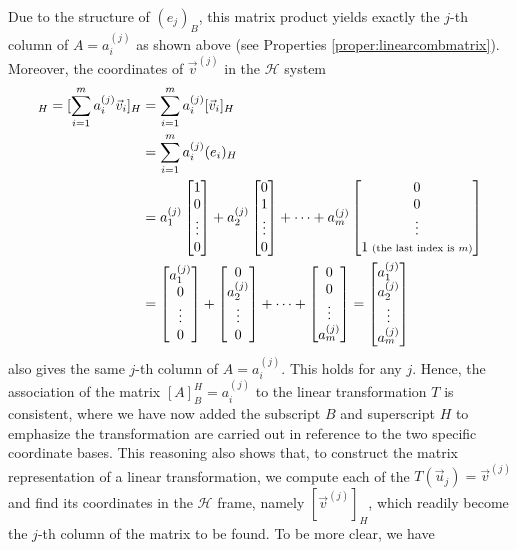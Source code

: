 Due to the structure of $(e_j)_B$, this matrix product yields exactly the $j$-th column of $A = a_i^{(j)}$ as shown above (see Properties \ref{proper:linearcombmatrix}). Moreover, the coordinates of $\vec{v}^{(j)}$ in the $\mathcal{H}$ system
\begin{align*}
[\vec{v}^{(j)}]_H = [\sum_{i=1}^{m} a_i^{(j)}\vec{v}_i]_H &= \sum_{i=1}^{m} a_i^{(j)}[\vec{v}_i]_H \\
&= \sum_{i=1}^{m} a_i^{(j)}(e_i)_H \\
&=  a_1^{(j)} \begin{bmatrix}
1 \\
0 \\
\vdots \\
0
\end{bmatrix}
+
a_2^{(j)} \begin{bmatrix}
0 \\
1 \\
\vdots \\
0
\end{bmatrix}
+ \cdots
+
a_m^{(j)} \begin{bmatrix}
0 \\
0 \\
\vdots \\
1 {\scriptsize \text{ (the last index is $m$)}}
\end{bmatrix}
\\
&= \begin{bmatrix}
a_1^{(j)} \\
0 \\
\vdots \\
0
\end{bmatrix}
+
\begin{bmatrix}
0 \\
a_2^{(j)} \\
\vdots \\
0
\end{bmatrix}
+ \cdots
+
\begin{bmatrix}
0 \\
0 \\
\vdots \\
a_m^{(j)}
\end{bmatrix}
=
\begin{bmatrix}
a_1^{(j)} \\
a_2^{(j)} \\
\vdots \\
a_m^{(j)}
\end{bmatrix}
\end{align*}
also gives the same $j$-th column of $A = a_i^{(j)}$. This holds for any $j$. Hence, the association of the matrix $[A]_B^H = a_i^{(j)}$ to the linear transformation $T$ is consistent, where we have now added the subscript $B$ and superscript $H$ to emphasize the transformation are carried out in reference to the two specific coordinate bases. This reasoning also shows that, to construct the matrix representation of a linear transformation, we compute each of the $T(\vec{u}_j) = \vec{v}^{(j)}$ and find its coordinates in the $\mathcal{H}$ frame, namely $[\vec{v}^{(j)}]_H$, which readily become the $j$-th column of the matrix to be found. To be more clear, we have
